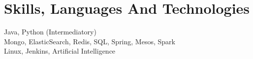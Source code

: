 \documentclass[a4paper,10pt]{article}
\begin{document}
\section{Skills, Languages And Technologies}
Java, Python (Intermediatory)\\ Mongo, ElasticSearch, Redis, SQL, Spring, Mesos, Spark\\
Linux, Jenkins, Artificial Intelligence
\end{document}
